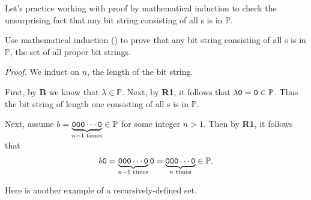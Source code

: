 Let's practice working with proof by mathematical induction to check the unsurprising fact that any bit string consisting of all s is in $\mathbb{P}$.

\begin{exam} 
\label{exam_math_ind_all0s_proper}
    Use mathematical induction () to prove that any bit string consisting of all s is in $\mathbb{P}$, the set of all proper bit strings.
        \begin{soln}
            \emph{Proof.}  We induct on $n$, the length of the bit string. 
            
            First, by \textbf{B} we know that $\lambda \in \mathbb{P}$. Next, by \textbf{R1}, it follows that $\lambda \texttt{0} = \texttt{0} \in \mathbb{P}$.  Thus the bit string of length one consisting of all s is in $\mathbb{P}$.

            Next, assume $b = \underbrace{\texttt{000}\cdots\texttt{0}}_{n-1 \text{ times}} \in \mathbb{P}$ for some integer $n > 1$.  Then by \textbf{R1}, it follows that $$b\texttt{0} = \underbrace{\texttt{000}\cdots\texttt{0}}_{n-1 \text{ times}}\texttt{0} = \underbrace{\texttt{000}\cdots\texttt{0}}_{n \text{ times}} \in \mathbb{P}.$$
        \end{soln}
\end{exam}

Here is another example of a recursively-defined set.

